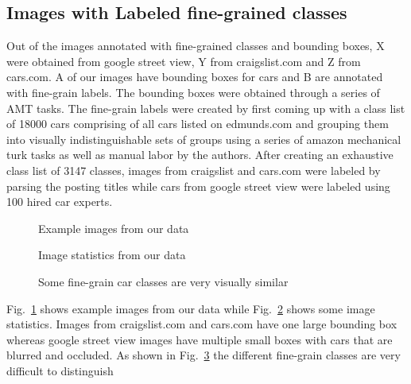 \documentclass[10pt,twocolumn,letterpaper]{article}
\begin{document}
\subsection{Images with Labeled fine-grained classes}
Out of the images annotated with fine-grained classes and bounding boxes, X were obtained from google street view, Y from craigslist.com and Z from cars.com. A of our images have bounding boxes for cars and B are annotated with fine-grain labels. The bounding boxes were obtained through a series of AMT tasks. The fine-grain labels were created by first coming up with a class list of 18000 cars comprising of all cars listed on edmunds.com and grouping them into visually indistinguishable sets of groups using a series of amazon mechanical turk tasks as well as manual labor by the authors. After creating an exhaustive class list of 3147 classes, images from craigslist and cars.com were labeled by parsing the posting titles while cars from google street view were labeled using 100 hired car experts.

\begin{figure}[t]
\begin{center}
\fbox{\rule{0pt}{2in} \rule{0.9\linewidth}{0pt}}
\end{center}
   \caption{Example images from our data}
\label{fig:dataset1}

\end{figure}

\begin{figure}[t]
\begin{center}
\fbox{\rule{0pt}{2in} \rule{0.9\linewidth}{0pt}}
\end{center}
   \caption{Image statistics from our data}
\label{fig:dataset2}

\end{figure}

\begin{figure}[t]
\begin{center}
\fbox{\rule{0pt}{2in} \rule{0.9\linewidth}{0pt}}
\end{center}
   \caption{Some fine-grain car classes are very visually similar}
\label{fig:dataset3}
\end{figure}

Fig.~\ref{fig:dataset1} shows example images from our data while Fig.~\ref{fig:dataset2} shows some image statistics. Images from craigslist.com and cars.com have one large bounding box whereas google street view images have multiple small boxes with cars that are blurred and occluded. As shown in Fig.~\ref{fig:dataset3} the different fine-grain classes are very difficult to distinguish
\end{document}
